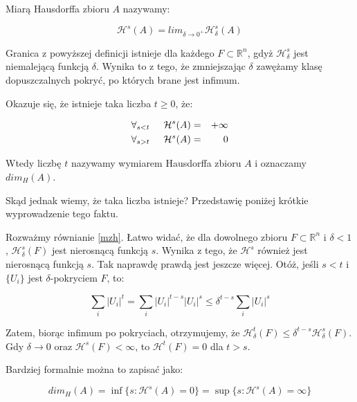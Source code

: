 \documentclass{mini}
\begin{document}
\begin{df}

Miarą Hausdorffa zbioru $A$ nazywamy:

\begin{equation}
\mathcal{H}^s(A)=lim_{\delta\rightarrow0^+} \mathcal{H}^s_{\delta}(A)
\end{equation}

\end{df}


\vspace*{2\baselineskip}

Granica z powyższej definicji istnieje dla każdego $F \subset \mathbb{R}^n$, gdyż $\mathcal{H}^{s}_{\delta}$ jest niemalejącą funkcją $\delta$. Wynika to z tego, że zmniejszając $\delta$ zawężamy klasę dopuszczalnych pokryć, po których brane jest infimum.

\vspace*{1\baselineskip}

Okazuje się, że istnieje taka liczba $t\geqslant0$, że:

\begin{eqnarray}
\forall_{s<t}\hspace{5mm} \mathcal{H}^s(A)&=&+\infty \\
\forall_{s>t} \hspace{5mm}\mathcal{H}^s(A)&=&0 
\end{eqnarray}

Wtedy liczbę $t$ nazywamy wymiarem Hausdorffa zbioru $A$ i oznaczamy $dim_H(A)$.

Skąd jednak wiemy, że taka liczba istnieje? Przedstawię poniżej krótkie wyprowadzenie tego faktu.

Rozważmy równianie \eqref{mzh}. Łatwo widać, że dla dowolnego zbioru $F\subset \mathbb{R}^n$ i $\delta <1$, $\mathcal{H}^s_{\delta}(F)$ jest nierosnącą funkcją $s$. Wynika z tego, że $\mathcal{H}^s$ również jest nierosnącą funkcją $s$. Tak naprawdę prawdą jest jeszcze więcej. Otóż, jeśli $s<t$ i $\lbrace U_i \rbrace$ jest $\delta$-pokryciem $F$, to:

$$ \sum_i |U_i|^t = \sum_i |U_i|^{t-s}|U_i|^s \leqslant \delta^{t-s}\sum_i |U_i|^s$$

Zatem, biorąc infimum po pokryciach, otrzymujemy, że $\mathcal{H}^t_{\delta}(F)\leqslant \delta^{t-s} \mathcal{H}^s_{\delta}(F)$. Gdy $\delta\rightarrow 0$ oraz $\mathcal{H}^s(F)<\infty$, to $\mathcal{H}^t(F)=0$ dla $t>s$. 


Bardziej formalnie można to zapisać jako:

\begin{equation}
dim_H(A)= \inf\lbrace s: \mathcal{H}^s(A)=0\rbrace=\sup\lbrace s: \mathcal{H}^s(A)=\infty\rbrace
\end{equation}
\end{document}
